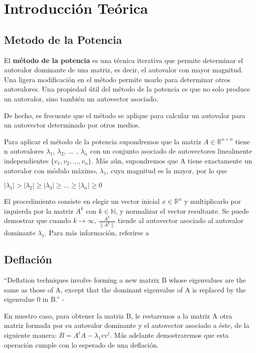 \section{Introducci\'on Te\'orica}
\subsection{Metodo de la Potencia}
El \textbf{método de la potencia} es una técnica iterativa que permite determinar el autovalor dominante de una matriz, es decir, el autovalor con mayor magnitud. Una ligera modificación en el método permite usarlo para determinar otros autovalores. Una propiedad útil del método de la potencia es que no solo produce un autovalor, sino también un autovector asociado. 

De hecho, es frecuente que el método se aplique para calcular un autovalor para un autovector determinado por otros medios.

Para aplicar el método de la potencia supondremos que la matriz $A \in \mathbb{R}^{n \times n}$ tiene n autovalores $\lambda_1$, $\lambda_2$, ... , $\lambda_n$ con un conjunto asociado de autovectores linealmente independientes $\{v_1,v_2, ..., v_n\}$. Más aún, supondremos que A tiene exactamente un autovalor con módulo máximo, $\lambda_1$, cuya magnitud es la mayor, por lo que 
\begin{center}
$|\lambda_1| > |\lambda_2| \geq |\lambda_3| \geq ... \geq |\lambda_n| \geq 0$
\end{center}

%
%
%
%
%
%

El procedimiento consiste en elegir un vector inicial $x \in \mathbb{R}^n$ y multiplicarlo por izquierda por la matriz $A^k$ 
con $k \in \mathbb{N}$, y normalizar el vector resultante. Se puede demostrar que cuando $k \rightarrow \infty$, 
$\frac{A^k}{\| A^k \| }$ tiende al autovector asociado al autovalor  dominante $\lambda_1$. Para más información, referirse
a \cite{burden} 

\subsection{Deflación}

``Deflation techniques involve forming a new matrix B whose eigenvalues are the same as those of A, except that the dominant eigenvalue of A is replaced by the eigenvalue $0$ in B.'' - \cite[p.~604]{burden}

En nuestro caso, para obtener la matriz B, le restaremos a la matriz A otra matriz formada por su autovalor dominante y el autovector asociado a éste, de la siguiente manera: $B = A^t A - \lambda_{1} v v^t$. Más adelante demostraremos que esta operación cumple con lo esperado de una deflación.
